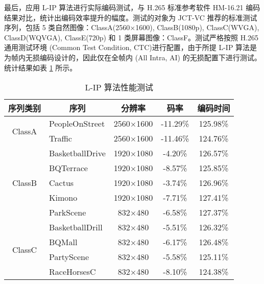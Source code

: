 最后，应用 L-IP 算法进行实际编码测试，与 H.265 标准参考软件 HM-16.21 编码结果对比，统计出编码效率提升的幅度。测试的对象为 JCT-VC 推荐的标准测试序列，包括 5 类自然图像：ClassA(2560$\times$1600), ClassB(1080p), ClassC(WVGA), ClassD(WQVGA), ClassE(720p) 和 1 类屏幕图像：ClassF。测试严格按照 H.265 通用测试环境 (Common Test Condition, CTC)进行配置，由于所提 L-IP 算法是为帧内无损编码设计的，因此仅在全帧内 (All Intra, AI) 的无损配置下进行测试。统计结果如表 \ref{tab:L-IPSummary} 所示。
\begin{table}[htbp]
    \centering
    \caption{L-IP 算法性能测试}
    \label{tab:L-IPSummary}
    \begin{tabular}{@{}clccc@{}}
        \toprule
        序列类别                               & \multicolumn{1}{c}{序列}     & 分辨率           & 码率     & 编码时间 \\ \midrule
        \multirow{2}{*}{ClassA}                & PeopleOnStreet               & 2560$\times$1600 & -11.29\% & 125.98\% \\
                                               & Traffic                      & 2560$\times$1600 & -11.46\% & 124.76\% \\
        \multirow{5}{*}{ClassB}                & BasketballDrive              & 1920$\times$1080 & -4.20\%  & 126.57\% \\
                                               & BQTerrace                    & 1920$\times$1080 & -8.57\%  & 125.85\% \\
                                               & Cactus                       & 1920$\times$1080 & -3.74\%  & 126.96\% \\
                                               & Kimono                       & 1920$\times$1080 & -7.71\%  & 127.41\% \\
                                               & ParkScene                    & 832$\times$480   & -6.58\%  & 127.37\% \\
        \multirow{4}{*}{ClassC}                & BasketballDrill              & 832$\times$480   & -5.51\%  & 126.32\% \\
                                               & BQMall                       & 832$\times$480   & -6.17\%  & 126.48\% \\
                                               & PartyScene                   & 832$\times$480   & -5.58\%  & 125.11\% \\
                                               & RaceHorsesC                  & 832$\times$480   & -8.10\%  & 124.38\% \\

\end{tabular}
\end{table}
